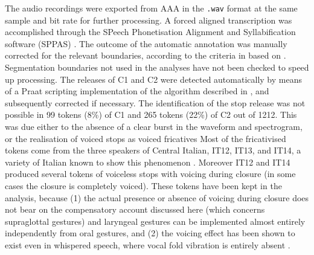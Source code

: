 \documentclass[12pt,]{article}
\begin{document}

The audio recordings were exported from AAA in the \texttt{.wav} format
at the same sample and bit rate for further processing. A forced aligned
transcription was accomplished through the SPeech Phonetisation
Alignment and Syllabification software (SPPAS) \citep{bigi2015}. The
outcome of the automatic annotation was manually corrected for the
relevant boundaries, according to the criteria in 
based on \citet{machac2009}. Segmentation boundaries not used in the
analyses have not been checked to speed up processing. The releases of
C1 and C2 were detected automatically by means of a Praat scripting
implementation of the algorithm described in
\citet{ananthapadmanabha2014}, and subsequently corrected if necessary.
The identification of the stop release was not possible in 99 tokens
(8\%) of C1 and 265 tokens (22\%) of C2 out of 1212. This was due either
to the absence of a clear burst in the waveform and spectrogram, or the
realisation of voiced stops as voiced fricatives Most of the
fricativised tokens come from the three speakers of Central Italian,
IT12, IT13, and IT14, a variety of Italian known to show this phenomenon
\citealt{hualde2011}. Moreover IT12 and IT14 produced several tokens of
voiceless stops with voicing during closure (in some cases the closure
is completely voiced). These tokens have been kept in the analysis,
because (1) the actual presence or absence of voicing during closure
does not bear on the compensatory account discussed here (which concerns
supraglottal gestures) and laryngeal gestures can be implemented almost
entirely independently from oral gestures, and (2) the voicing effect
has been shown to exist even in whispered speech, where vocal fold
vibration is entirely absent \citep{sharf1964}.
\end{document}
